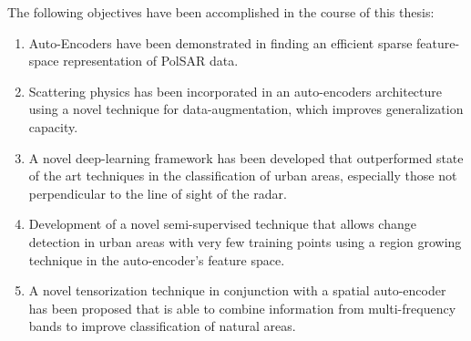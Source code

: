 The following objectives have been accomplished in the course of this thesis:

\begin{enumerate}
\item Auto-Encoders have been demonstrated in finding an efficient sparse feature-space representation of PolSAR data.
\item Scattering physics has been incorporated in an auto-encoders architecture using a novel technique for data-augmentation, which improves generalization capacity. 
\item A novel deep-learning framework has been developed that outperformed state of the art techniques in the classification of urban areas, especially those not perpendicular to the line of sight of the radar.
\item Development of a novel semi-supervised technique that allows change detection in urban areas with very few training points using a region growing technique in the auto-encoder's feature space. 
\item A novel tensorization technique in conjunction with a spatial auto-encoder has been proposed that is able to combine information from multi-frequency bands to improve classification of natural areas. 
\end{enumerate}


